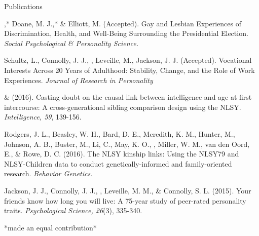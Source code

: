 \begin{rSection}{\textrm{Publications}}%
\begin{etaremune}
\item\meb,* Doane, M. J.,* \& Elliott, M. (Accepted). Gay and Lesbian Experiences of Discrimination, Health, and Well-Being Surrounding the Presidential Election. \textit{Social Psychological \& Personality Science.}  \href{ https://dx.doi.org/10.17605/OSF.IO/DWSCM}{\color{blue}{Accepted Version}}
\item Schultz, L., Connolly, J. J., \meb, Leveille, M., Jackson, J. J. (Accepted). Vocational Interests Across 20 Years of Adulthood: Stability, Change, and the Role of Work Experiences. \textit{Journal of Research in Personality}
\item\meb \& \Joe (2016). Casting doubt on the causal link between intelligence and age at first intercourse: A cross-generational sibling comparison design using the NLSY. \textit{Intelligence, 59}, 139-156. \href{http://www.sciencedirect.com/science/article/pii/S0160289616300162}{\color{blue}{doi:10.1016/j.intell.2016.08.008}}
\item Rodgers, J. L., Beasley, W. H., Bard, D. E., Meredith, K. M., Hunter, M., Johnson, A. B., Buster, M., Li, C., May, K. O., \meb, Miller, W. M., van den Oord, E., \& Rowe, D. C. (2016). The NLSY kinship links: Using the NLSY79 and NLSY-Children data to conduct genetically-informed and family-oriented research. \textit{Behavior Genetics}. \href{http://dx.doi.org/10.1007/s10519-016-9785-3}{\color{blue}{doi:10.1007/s10519-016-9785-3}}
%
\item Jackson, J. J., Connolly, J. J., \meb, Leveille, M. M., \& Connolly, S. L. (2015). Your friends know how long you will live: A 75-year study of peer-rated personality traits. \textit{Psychological Science, 26}(3), 335-340.\\ \href{http://pss.sagepub.com/content/26/3/335}{\color{blue}{doi:10.1177/0956797614561800}}
\vspace{-2mm}\begin{center}\footnotesize{*made an equal contribution*}\end{center} \vspace{-3mm}
\end{etaremune}\end{rSection}%